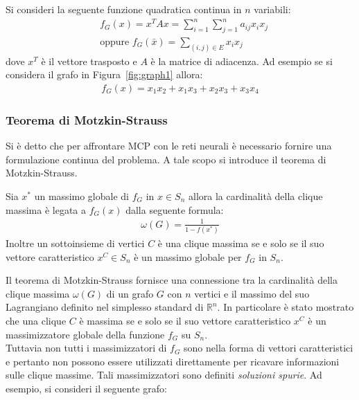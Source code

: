 Si consideri la seguente funzione quadratica continua in $n$ variabili:
\begin{align*}
    &f_G(x) = x^T A x = \sum_{i=1}^n \sum_{j=1}^n a_{ij} x_i x_j \tag{Lagrangiano del grafo} \\
    &\text{oppure } f_G(\bar{x}) = \sum_{(i,j) \in E} x_i x_j
\end{align*}
dove $x^T$ è il vettore trasposto e $A$ è la matrice di adiacenza. Ad esempio se si considera il grafo in Figura~\ref{fig:graph1} allora:
\begin{align*}
    f_G(x) = x_1 x_2 + x_1 x_3 + x_2 x_3 + x_3 x_4
\end{align*}

\subsubsection{Teorema di Motzkin-Strauss} %
Si è detto che per affrontare MCP con le reti neurali è necessario fornire una formulazione continua del problema. A tale scopo si introduce il teorema di Motzkin-Strauss.
\begin{thm}
    Sia $x^*$ un massimo globale di $f_G$ in $x \in S_n$ allora la cardinalità della clique massima è legata a $f_G(x)$  dalla seguente formula:
    \begin{align*}
           \omega(G) = \frac{1}{1 - f(x^*)}
    \end{align*}
    Inoltre un sottoinsieme di vertici $C$ è una clique massima se e solo se il suo vettore caratteristico $x^C \in S_n$ è un massimo globale per $f_G$ in $S_n$.
\end{thm} 
\newpage

Il teorema di Motzkin-Strauss fornisce una connessione tra la cardinalità della clique massima $\omega(G)$ di un grafo $G$ con $n$ vertici e il massimo del suo Lagrangiano definito nel simplesso standard di $\mathbb{R}^n$. In particolare è stato mostrato che una clique $C$ è massima se e solo se il suo vettore caratteristico $x^C$ è un massimizzatore globale della funzione $f_G$ su $S_n$.\\

Tuttavia non tutti i massimizzatori di $f_G$ sono nella forma di vettori caratteristici e pertanto non possono essere utilizzati direttamente per ricavare informazioni sulle clique massime. Tali massimizzatori sono definiti \emph{soluzioni spurie}. Ad esempio, si consideri il seguente grafo:

